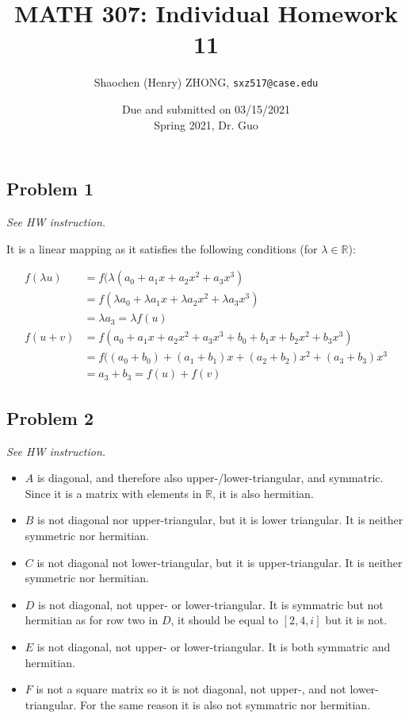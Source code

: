\documentclass[11pt]{article}
\newcommand{\ilc}{\texttt}
\begin{document}
\title{\textbf{MATH 307: Individual Homework 11}}


\author{Shaochen (Henry) ZHONG, \ilc{sxz517@case.edu}}

\date{Due and submitted on 03/15/2021 \\ Spring 2021, Dr. Guo}
\maketitle



\subsection*{Problem 1}
\textit{See HW instruction.}\newline

It is a linear mapping as it satisfies the following conditions (for $\lambda \in \mathbb{R}$):

\begin{align*}
    f(\lambda u) &= f(\lambda (a_0 + a_1 x + a_2 x^2 + a_3 x^3) \\
    &= f(\lambda a_0 + \lambda a_1 x + \lambda a_2 x^2 + \lambda a_3 x^3) \\
    &= \lambda a_3 = \lambda f(u)\\
    f(u + v) &= f(a_0 + a_1 x + a_2 x^2 + a_3 x^3 + b_0 + b_1 x + b_2 x^2 + b_3 x^3) \\
    &= f( (a_0 + b_0) + (a_1 + b_1) x + (a_2 + b_2) x^2 + (a_3 + b_3) x^3 \\
    &= a_3 + b_3 = f(u) + f(v)
\end{align*}




\subsection*{Problem 2}
\textit{See HW instruction.}\newline

\begin{itemize}
    \item $A$ is diagonal, and therefore also upper-/lower-triangular, and symmatric. Since it is a matrix with elements in $\mathbb{R}$, it is also hermitian.
    \item $B$ is not diagonal nor upper-triangular, but it is lower triangular. It is neither symmetric nor hermitian.
    \item $C$ is not diagonal not lower-triangular, but it is upper-triangular. It is neither symmetric nor hermitian.
    \item $D$ is not diagonal, not upper- or lower-triangular. It is symmatric but not hermitian as for row two in $D$, it should be equal to $[2, 4, i]$ but it is not.
    \item $E$ is not diagonal, not upper- or lower-triangular. It is both symmatric and hermitian.
    \item $F$ is not a square matrix so it is not diagonal, not upper-, and not lower-triangular. For the same reason it is also not symmatric nor hermitian.
\end{itemize}
\end{document}
